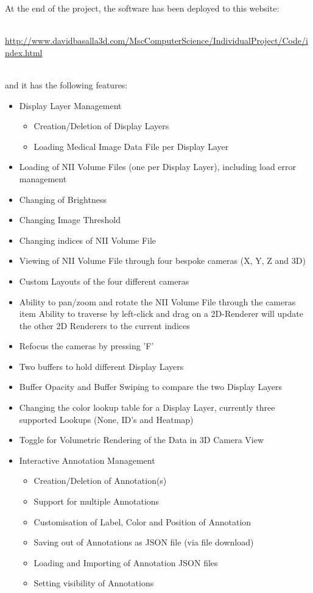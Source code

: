 \documentclass[a4paper,11pt,twoside]{article}
\begin{document}
At the end of the project, the software has been deployed to this website:

\noindent
\\
\url{http://www.davidbasalla3d.com/MscComputerScience/IndividualProject/Code/index.html}

\noindent
\\
and it has the following features:



\begin{itemize}
\item Display Layer Management

  \begin{itemize}
  \item Creation/Deletion of Display Layers
  \item Loading Medical Image Data File per Display Layer
  \end{itemize}

\item Loading of NII Volume Files (one per Display Layer), including load error management	
\item Changing of Brightness
\item Changing Image Threshold
\item Changing indices of NII Volume File
\item Viewing of NII Volume File through four bespoke cameras (X, Y, Z and 3D)
\item Custom Layouts of the four different cameras
\item Ability to pan/zoom and rotate the NII Volume File through the cameras
  item Ability to traverse by left-click and drag on a 2D-Renderer will update the other 2D Renderers to the current indices
\item Refocus the cameras by pressing 'F'
\item Two buffers to hold different Display Layers
\item Buffer Opacity and Buffer Swiping to compare the two Display Layers
\item Changing the color lookup table for a Display Layer, currently three supported Lookups (None, ID's and Heatmap)
\item Toggle for Volumetric Rendering of the Data in 3D Camera View
\item Interactive Annotation Management

  \begin{itemize}
  \item Creation/Deletion of Annotation(s)
  \item Support for multiple Annotations
  \item Customisation of Label, Color and Position of Annotation
  \item Saving out of Annotations as JSON file (via file download)
  \item Loading and Importing of Annotation JSON files
  \item Setting visibility of Annotations
  \end{itemize}


\end{itemize}
\end{document}
